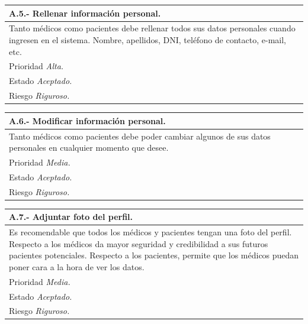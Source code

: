 \documentclass[a4paper,oneside,11pt]{book}
\begin{document}
\begin{center}
\begin{tabulary}{15cm}{|L|}
	\hline
		\bf{A.5.- Rellenar información personal.} \\
	\hline
		Tanto médicos como pacientes debe rellenar todos sus datos personales cuando ingresen en el sistema. Nombre, apellidos, DNI, teléfono de contacto, e-mail, etc. \\
	\hline
		Prioridad \textit{Alta.} \\
	\hline
		Estado \textit{Aceptado.} \\
	\hline
		Riesgo \textit{Riguroso.} \\
	\hline
\end{tabulary}
\end{center}

\begin{center}
\begin{tabulary}{15cm}{|L|}
	\hline
		\bf{A.6.- Modificar información personal.} \\	
	\hline
		Tanto médicos como pacientes debe poder cambiar algunos de sus datos personales en cualquier momento que desee. \\
	\hline
		Prioridad \textit{Media.} \\
	\hline
		Estado \textit{Aceptado.} \\
	\hline
		Riesgo \textit{Riguroso.} \\
	\hline
\end{tabulary}
\end{center}

\begin{center}
\begin{tabulary}{15cm}{|L|}
	\hline
		\bf{A.7.- Adjuntar foto del perfil.} \\
	\hline
		Es recomendable que todos los médicos y pacientes tengan una foto del perfil. Respecto a los médicos da mayor seguridad y credibilidad a sus futuros pacientes potenciales. Respecto a los pacientes, permite que los médicos puedan poner cara a la hora de ver los datos. \\
	\hline
		Prioridad \textit{Media.} \\
	\hline
		Estado \textit{Aceptado.} \\
	\hline
		Riesgo \textit{Riguroso.} \\
	\hline
\end{tabulary}
\end{center}
\end{document}
